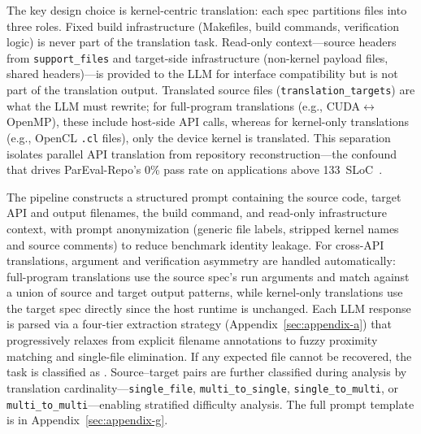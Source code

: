 The key design choice is kernel-centric translation: each spec partitions files into three roles. Fixed build infrastructure (Makefiles, build commands, verification logic) is never part of the translation task. Read-only context---source headers from \texttt{support\_files} and target-side infrastructure (non-kernel payload files, shared headers)---is provided to the LLM for interface compatibility but is not part of the translation output. Translated source files (\texttt{translation\_targets}) are what the LLM must rewrite; for full-program translations (e.g., CUDA$\leftrightarrow$OpenMP), these include host-side API calls, whereas for kernel-only translations (e.g., OpenCL \texttt{.cl} files), only the device kernel is translated. This separation isolates parallel API translation from repository reconstruction---the confound that drives ParEval-Repo's 0\% pass rate on applications above 133~SLoC~\cite{ParEvalRepo2025}.

The pipeline constructs a structured prompt containing the source code, target API and output filenames, the build command, and read-only infrastructure context, with prompt anonymization (generic file labels, stripped kernel names and source comments) to reduce benchmark identity leakage. For cross-API translations, argument and verification asymmetry are handled automatically: full-program translations use the source spec's run arguments and match against a union of source and target output patterns, while kernel-only translations use the target spec directly since the host runtime is unchanged. Each LLM response is parsed via a four-tier extraction strategy (Appendix~\ref{sec:appendix-a}) that progressively relaxes from explicit filename annotations to fuzzy proximity matching and single-file elimination. If any expected file cannot be recovered, the task is classified as \extractionfail{}. Source--target pairs are further classified during analysis by translation cardinality---\texttt{single\_file}, \texttt{multi\_to\_single}, \texttt{single\_to\_multi}, or \texttt{multi\_to\_multi}---enabling stratified difficulty analysis. The full prompt template is in Appendix~\ref{sec:appendix-g}.


